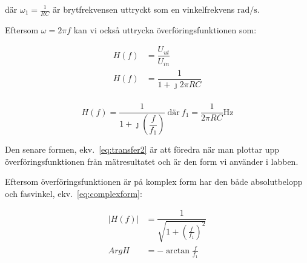 där $\omega_1 = \tfrac{1}{R C}$ är brytfrekvensen uttryckt som en
vinkelfrekvens $\si{\radian\per\second}$.


\par 
Eftersom $\omega = 2 \pi f$ kan vi också uttrycka överföringsfunktionen som:

\begin{equation*}
  \begin{split}
    H(f) &= \dfrac{U_{ut}}{U_{in}}        \\
    H(f) &= \dfrac{1}{1+\jmath 2 \pi R C} \\
  \end{split}
\end{equation*}

\begin{equation}\label{eq:transfer2}
  H(f) = \dfrac{1}{1+\jmath (\dfrac{f}{f_1})}\
  \text{där}\ f_1 = \dfrac{1}{2 \pi R C} \si{\Hz}
\end{equation}


\par Den senare formen, ekv.~\eqref{eq:transfer2} är att föredra när man
plottar upp överföringsfunktionen från mätresultatet och är den form vi
använder i labben.

Eftersom överföringsfunktionen är på komplex form har den både absolutbelopp
och fasvinkel, ekv.~\eqref{eq:complexform}:

\begin{equation}\label{eq:complexform}
  \begin{split}
    |H(f)| &= \dfrac{1}{\sqrt{1+{(\frac{f}{f_1})}^2}} \\
      ArgH &= -\arctan{\frac{f}{f_1}}
  \end{split}
\end{equation}




